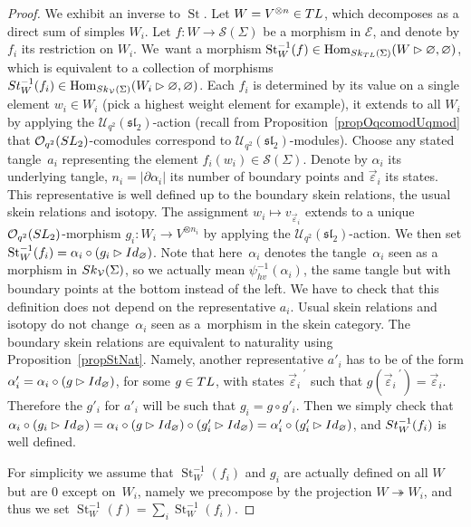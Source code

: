 \documentclass[11pt]{article}
\numberwithin{equation}{section}
\numberwithin{equation}{section}
\newcommand{\abss}[1]{\left\vert #1 \right\vert}
\newcommand{\St}{\operatorname{St}}
\newcommand{\Hom}{\operatorname{Hom}}
\newcommand{\Oq}{\mathcal{O}_{q^2}({\rm SL}_2)}
\newcommand{\Uq}{\mathcal{U}_{q^2}(\mathfrak{sl}_2)}
\begin{document}
\begin{proof}
We exhibit an inverse to $\St$. Let $W=V^{\otimes n}\in {\rm TL}$, which decomposes as a direct sum of simples $W_i$. Let $f\colon W\to \mathscr{S}(\Sigma)$ be a morphism in $\mathcal{E}$, and denote by $f_i$ its restriction on $W_i$. We~want a morphism $\St_W^{-1}(f) \in \Hom_{{\rm Sk}_{{\rm TL}}(\Sigma)}(W\rhd \varnothing,\varnothing)$, which is equivalent to a collection of morphisms ${\rm St}_W^{-1}(f_i) \in \Hom_{{\rm Sk}_{\mathcal{V}}(\Sigma)}(W_i\rhd \varnothing,\varnothing)$. Each $f_i$ is determined by its value on a single element $w_i\in W_i$ (pick a highest weight element for example), it extends to all $W_i$ by applying the $\Uq$-action (recall from Proposition~\ref{propOqcomodUqmod} that $\Oq$-comodules correspond to $\Uq$-modules). Choose any stated tangle~$a_i$ representing the element $f_i(w_i) \in \mathscr{S}(\Sigma)$. Denote by $\alpha_i$ its underlying tangle, $n_i=\abss{\partial \alpha_i}$ its number of boundary points and $\vec{\varepsilon}_i$ its states. This representative is well defined up to the boundary skein relations, the usual skein relations and isotopy. The assignment $w_i \mapsto v_{\vec{\varepsilon}_i}$ extends to a unique $ \Oq$-morphism $g_i\colon W_i \to V^{\otimes n_i}$ by applying the $\Uq$-action. We then set $\St_W^{-1}(f_i) = \alpha_i\circ (g_i \rhd {\rm Id}_\varnothing)$. Note that here~$\alpha_i$ denotes the tangle~$\alpha_i$ seen as a morphism in ${\rm Sk}_\mathcal{V}(\Sigma)$, so we actually mean $\psi_{hv}^{-1}(\alpha_i)$, the same tangle but with boundary points at the bottom instead of the left. We have to check that this definition does not depend on the representative $a_i$. Usual skein relations and isotopy do not change~$\alpha_i$ seen as a~morphism in the skein category. The boundary skein relations are equivalent to naturality using Proposition~\ref{propStNat}. Namely, another representative $a'_i$ has to be of the form $\alpha'_i= \alpha_i \circ (g \rhd {\rm Id}_\varnothing)$, for some $g \in {\rm TL}$, with states ${\vec{\varepsilon}_i}^{\ '}$ such that $g({\vec{\varepsilon}_i}^{\ '})=\vec{\varepsilon}_i$. Therefore the $g'_i$ for $a'_i$ will be such that $g_i = g \circ g'_i$. Then we simply check that $\alpha_i\circ (g_i \rhd {\rm Id}_\varnothing) = \alpha_i\circ (g \rhd {\rm Id}_\varnothing) \circ (g'_i \rhd {\rm Id}_\varnothing) = \alpha'_i\circ (g'_i \rhd {\rm Id}_\varnothing)$, and ${\rm St}_W^{-1}(f_i)$ is well defined.

For simplicity we assume that $\St_W^{-1}(f_i)$ and $g_i$ are actually defined on all $W$ but are 0 except on~$W_i$, namely we precompose by the projection $W \twoheadrightarrow W_i$, and thus we set $\St_W^{-1}(f) = \sum_i \St_W^{-1}(f_i)$.


\end{proof}
\end{document}
